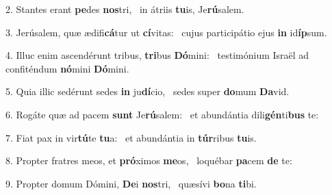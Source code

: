 2. Stantes erant \textbf{pe}des \textbf{nos}tri, \ast\  in átriis \textbf{tu}is, Je\textbf{rú}salem.\

3. Jerúsalem, quæ ædifi\textbf{cá}tur ut \textbf{cí}vitas: \ast\  cujus participátio ejus \textbf{in} id\textbf{íp}sum.\

4. Illuc enim ascendérunt tribus, \textbf{tri}bus \textbf{Dó}mini: \ast\  testimónium Israël ad confiténdum \textbf{nó}mini \textbf{Dó}mini.\

5. Quia illic sedérunt sedes \textbf{in} ju\textbf{dí}cio, \ast\  sedes super \textbf{do}mum \textbf{Da}vid.\

6. Rogáte quæ ad pacem \textbf{sunt} Je\textbf{rú}salem: \ast\  et abundántia dili\textbf{gén}ti\textbf{bus} te:\

7. Fiat pax in vir\textbf{tú}te \textbf{tu}a: \ast\  et abundántia in \textbf{túr}ribus \textbf{tu}is.\

8. Propter fratres meos, et \textbf{pró}ximos \textbf{me}os, \ast\  loquébar \textbf{pa}cem \textbf{de} te:\

9. Propter domum Dómini, \textbf{De}i \textbf{nos}tri, \ast\  quæsívi \textbf{bo}na \textbf{ti}bi.\

